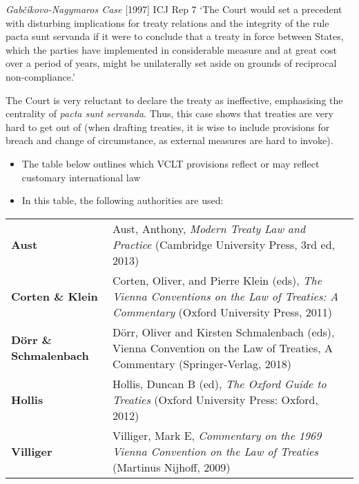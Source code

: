 \begin{casedetails}{\textit{Gabčíkovo-Nagymaros Case} [1997] ICJ Rep 7}
	`The Court would set a precedent with disturbing implications for treaty relations and the integrity of the rule pacta sunt servanda if it were to conclude that a treaty in force between States, which the parties have implemented in considerable measure and at great cost over a period of years, might be unilaterally set aside on grounds of reciprocal non-compliance.'

    \vspace{\baselineskip}

	The Court is very reluctant to declare the treaty as ineffective, emphasising the centrality of \textit{pacta sunt servanda}. Thus, this case shows that treaties are very hard to get out of (when drafting treaties, it is wise to include provisions for breach and change of circumstance, as external measures are hard to invoke).
\end{casedetails}

\begin{itemize}
    \item The table below outlines which VCLT provisions reflect or may reflect customary international law
    \item In this table, the following authorities are used:
\end{itemize}

{\renewcommand{\arraystretch}{1.2}\begin{longtable}{>{\raggedright\arraybackslash}p{}>{\raggedright\arraybackslash}p{}}
    \textbf{Aust} & Aust, Anthony, \textit{Modern Treaty Law and Practice} (Cambridge University Press, 3rd ed, 2013) \\
    \textbf{Corten \& Klein} & Corten, Oliver, and Pierre Klein (eds), \textit{The Vienna Conventions on the Law of Treaties: A Commentary} (Oxford University Press, 2011) \\
    \textbf{Dörr \& Schmalenbach} & Dörr, Oliver and Kirsten Schmalenbach (eds), Vienna Convention on
    the Law of Treaties, A Commentary (Springer-Verlag, 2018) \\
    \textbf{Hollis} & Hollis, Duncan B (ed), \textit{The Oxford Guide to Treaties} (Oxford University Press: Oxford, 2012) \\
    \textbf{Villiger} & Villiger, Mark E, \textit{Commentary on the 1969 Vienna Convention on the Law of Treaties} (Martinus Nijhoff, 2009)
\end{longtable}}

